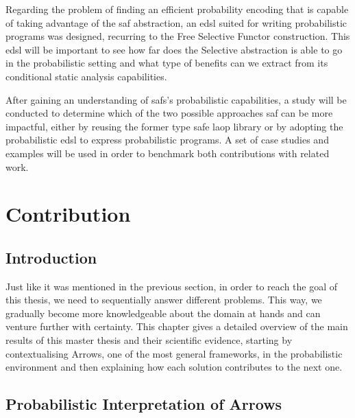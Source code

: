 \documentclass[
  oneside,
  11pt, a4paper,
  footinclude=true,
  headinclude=true,
  cleardoublepage=empty
]{scrbook}
\theoremstyle{definition}
\theoremstyle{definition}
\begin{document}
	Regarding the problem of finding an efficient probability encoding that is capable of taking advantage of the \gls{saf} abstraction, an \gls{edsl} suited for writing probabilistic programs was designed, recurring to the Free Selective Functor construction. This \gls{edsl} will be important to see how far does the Selective abstraction is able to go in the probabilistic setting and what type of benefits can we extract from its conditional static analysis capabilities.
	
    After gaining an understanding of \glspl{saf}'s probabilistic capabilities, a study will be conducted to determine which of the two possible approaches \gls{saf} can be more impactful, either by reusing the former type safe \gls{laop} library or by adopting the probabilistic \gls{edsl} to express probabilistic programs. A set of case studies and examples will be used in order to benchmark both contributions with related work.
    
    \chapter{Contribution}\label{sec-current-work}
	
	    \section{Introduction}
	    
	    Just like it was mentioned in the previous section, in order to reach the goal of this thesis, we need to sequentially answer different problems. This way, we gradually become more knowledgeable about the domain at hands and can venture further with certainty. This chapter gives a detailed overview of the main results of this master thesis and their scientific evidence, starting by contextualising Arrows, one of the most general frameworks, in the probabilistic environment and then explaining how each solution contributes to the next one.
	    
	    \section{Probabilistic Interpretation of Arrows}
	    
\end{document}
